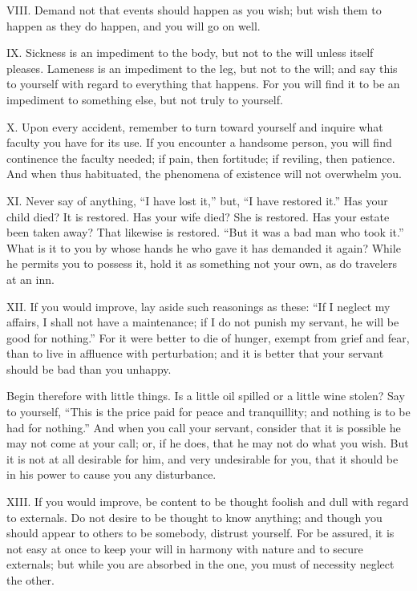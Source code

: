 \documentclass[a4paper]{article}
\begin{document}
VIII. Demand not that events should happen as you wish; but wish them to happen
as they do happen, and you will go on well.


IX. Sickness is an impediment to the body, but not to the will unless itself
pleases. Lameness is an impediment to the leg, but not to the will; and
say this to yourself with regard to everything that happens. For you will
find it to be an impediment to something else, but not truly to yourself.


X. Upon every accident, remember to turn toward yourself and inquire what
faculty you have for its use. If you encounter a handsome person, you
will find continence the faculty needed; if pain, then fortitude; if
reviling, then patience. And when thus habituated, the phenomena of
existence will not overwhelm you.


XI. Never say of anything, “I have lost it,” but, “I have restored it.” Has
your child died? It is restored. Has your wife died? She is restored. Has
your estate been taken away? That likewise is restored. “But it was a bad
man who took it.” What is it to you by whose hands he who gave it has
demanded it again? While he permits you to possess it, hold it as
something not your own, as do travelers at an inn.


XII. If you would improve, lay aside such reasonings as these: “If I neglect
my affairs, I shall not have a maintenance; if I do not punish my
servant, he will be good for nothing.” For it were better to die of
hunger, exempt from grief and fear, than to live in affluence with
perturbation; and it is better that your servant should be bad than you
unhappy.

Begin therefore with little things. Is a little oil spilled or a little
wine stolen? Say to yourself, “This is the price paid for peace and
tranquillity; and nothing is to be had for nothing.” And when you call
your servant, consider that it is possible he may not come at your call;
or, if he does, that he may not do what you wish. But it is not at all
desirable for him, and very undesirable for you, that it should be in his
power to cause you any disturbance.


XIII. If you would improve, be content to be thought foolish and dull with
regard to externals. Do not desire to be thought to know anything; and
though you should appear to others to be somebody, distrust yourself. For
be assured, it is not easy at once to keep your will in harmony with
nature and to secure externals; but while you are absorbed in the one,
you must of necessity neglect the other.
\end{document}
